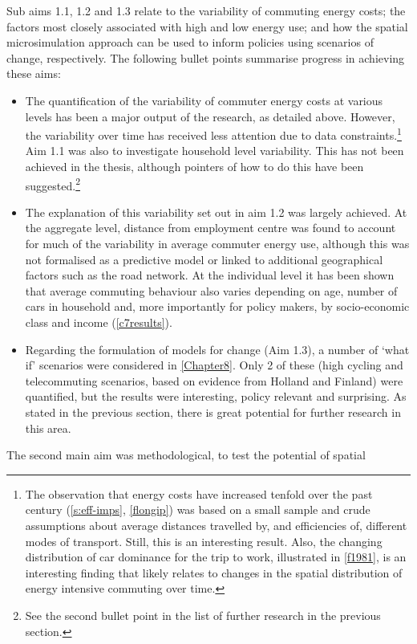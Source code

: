 Sub aims 1.1, 1.2 and 1.3 relate to the variability of commuting energy costs;
the factors most closely associated with high and low energy use; and how the
spatial microsimulation approach can be used to inform policies using scenarios
of change, respectively. The following bullet points summarise
progress in achieving these aims:
\begin{itemize}
 \item The quantification of the variability of commuter energy costs at various
levels has been a major output of the research, as detailed above. However, the
variability over time has received less attention due to data
constraints.\footnote{The
observation that energy costs have increased tenfold
over the past century (\cref{s:eff-imps}, \cref{flongip}) was based on a small
sample and crude assumptions about average distances travelled by, and
efficiencies of, different modes of transport. Still, this is an interesting
result. Also, the changing distribution of car dominance for the trip to work,
illustrated in \cref{f1981}, is an interesting finding that likely relates to
changes in the spatial distribution of energy
intensive commuting over time.
}
Aim 1.1 was also to investigate household level variability. This has not been
achieved in the thesis, although pointers of how to do this have been
suggested.\footnote{See
the second bullet point in the list of further research
in the previous section.
}
\item The explanation of this variability set out in aim 1.2 was largely
achieved. At the aggregate level, distance from employment centre was found to
account for much of the variability in average commuter energy use, although
this was not formalised as a predictive model or linked to additional
geographical factors such as the road network. At the individual level it has
been shown that average commuting behaviour also varies depending on age,
number of cars in household and, more importantly for policy makers, by
socio-economic class and income (\cref{c7results}).
\item Regarding the formulation of models for change (Aim 1.3), a number of
`what if' scenarios were considered in \cref{Chapter8}. Only 2 of
these (high cycling and telecommuting scenarios, based on evidence from Holland
and Finland) were quantified, but the results were interesting, policy relevant
and surprising. As stated in the previous section, there is great potential for
further research in this area.
\end{itemize}
The second main aim was methodological, to test the potential of spatial
